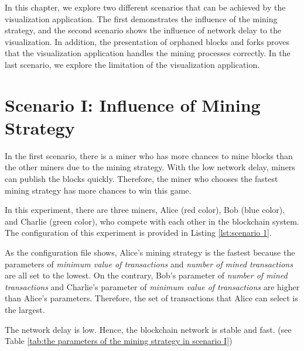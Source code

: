 In this chapter, we explore two different scenarios that can be achieved by the visualization application. The first demonstrates the influence of the mining strategy, and the second scenario shows the influence of network delay to the visualization. In addition, the presentation of orphaned blocks and forks proves that the visualization application handles the mining processes correctly. In the last scenario, we explore the limitation of the visualization application.

\section{Scenario I: Influence of Mining Strategy}

In the first scenario, there is a miner who has more chances to mine blocks than the other miners due to the mining strategy. With the low network delay, miners can publish the blocks quickly. Therefore, the miner who chooses the fastest mining strategy has more chances to win this game.

In this experiment, there are three miners, Alice (red color), Bob (blue color), and Charlie (green color), who compete with each other in the blockchain system. The configuration of this experiment is provided in Listing \ref{lst:scenario 1}.

As the configuration file shows, Alice's mining strategy is the fastest because the parameters of \textit{minimum value of transactions} and \textit{number of mined transactions} are all set to the lowest. On the contrary, Bob's parameter of \textit{number of mined transactions} and Charlie's parameter of \textit{minimum value of transactions} are higher than Alice's parameters. Therefore, the set of transactions that Alice can select is the largest.

The network delay is low. Hence, the blockchain network is stable and fast. (see Table \ref{tab:the parameters of the mining strategy in scenario I})

